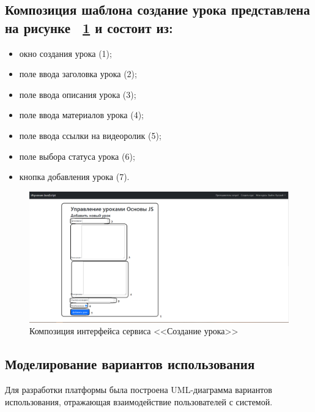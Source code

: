 \subsection*{Композиция шаблона создание урока представлена на рисунке ~\ref{templ:image10} и состоит из:}

\begin{itemize}
	\item окно создания урока (1);
	\item поле ввода заголовка урока (2);
	\item поле ввода описания урока (3);
	\item поле ввода материалов урока (4);
	\item поле ввода ссылки на видеоролик (5);
	\item поле выбора статуса урока (6);
	\item кнопка добавления урока (7).
\end{itemize}

\begin{figure}[htp!]
	\centering
	\includegraphics[width=0.8\linewidth]{images/создатьурок}
	\caption{Композиция интерфейса сервиса <<Создание урока>>}
	\label{templ:image10}
\end{figure}

\clearpage
\subsection{Моделирование вариантов использования}

Для разработки платформы была построена UML-диаграмма вариантов использования, отражающая взаимодействие пользователей с системой.


